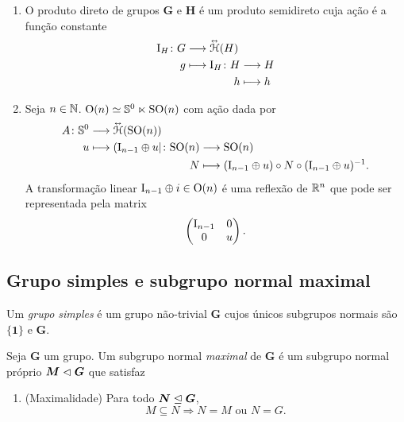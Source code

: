 \begin{example}
	\begin{enumerate}
		\item O produto direto de grupos $\bm G$ e $\bm H$ é um produto semidireto cuja ação é a função constante
	\begin{align*}
		\func{\Id_H}{G}{\Iso{\Homo}(H)}{g}{
			\begin{aligned}[t]
				\func{\Id_H}{H}{H}{h}{h}
			\end{aligned}
		}
	\end{align*}

	\item Seja $n \in \mathbb{N}$. $\operatorname{O}(n) \simeq \mathbb{S}^0 \ltimes \operatorname{SO}(n)$ com ação dada por
		\begin{align*}
			\func{A}{\S^0}{\Aut(\SO(n))}{u}{
				\begin{aligned}[t]
					\func{\con{\Id_{n-1} \oplus u}}{\SO(n)}{\SO(n)}{N}{(\Id_{n-1} \oplus u) \circ N \circ (\Id_{n-1} \oplus u)\inv}.
				\end{aligned}
			}
		\end{align*}
	A transformação linear $\mathrm{I}_{n-1} \oplus i \in \operatorname{O}(n)$ é uma reflexão de $\mathbb{R}^n$ que pode ser representada pela matrix
		\begin{equation*}
			\begin{pmatrix}
				\mathrm{I}_{n-1}	&	0 \\
				0			&	u
			\end{pmatrix}.
		\end{equation*}
	\end{enumerate}
\end{example}













\subsection{Grupo simples e subgrupo normal maximal}

\begin{definition}
Um \emph{grupo simples} é um grupo não-trivial $\bm G$ cujos únicos subgrupos normais são $\bm{\{1\}}$ e $\bm G$.
\end{definition}

\begin{definition}
Seja $\bm G$ um grupo. Um subgrupo normal \emph{maximal} de $\bm G$ é um subgrupo normal próprio $\bm M \mathrel{\lhd} \bm G$ que satisfaz
	\begin{enumerate}
	\item (Maximalidade) Para todo $\bm N \mathrel{\unlhd} \bm G$,
		\begin{equation*}
		M \subseteq N \Rightarrow N = M \text{\ \ ou\ \ } N = G.
		\end{equation*}
	\end{enumerate}
\end{definition}

